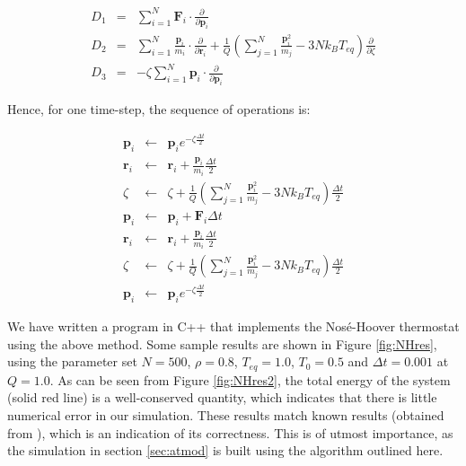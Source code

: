 \documentclass[a4paper,10pt]{article}
\begin{document}
\begin{eqnarray}
\displaystyle
D_1 &=& \sum_{i=1}^N \mathbf{F}_i \cdot \frac{\partial}{\partial \mathbf{p}_i} \\
D_2 &=& \displaystyle\sum_{i=1}^N \frac{\mathbf{p}_i}{m_i} \cdot \frac{\partial}{\partial \mathbf{r}_i} + \frac{1}{Q} \left( \displaystyle\sum_{j=1}^N \frac{\mathbf{p}_i^2}{m_j} - 3Nk_B T_{eq} \right) \frac{\partial}{\partial \zeta} \\
D_3 &=& -\zeta \sum_{i=1}^N \mathbf{p}_i \cdot \frac{\partial}{\partial \mathbf{p}_i}
\end{eqnarray}

Hence, for one time-step, the sequence of operations is:

\begin{eqnarray*}
\mathbf{p}_i &\leftarrow& \mathbf{p}_i e^{-\zeta \frac{\Delta t}{2}} \\
\mathbf{r}_i &\leftarrow& \mathbf{r}_i + \frac{\mathbf{p}_i}{m_i} \frac{\Delta t}{2} \\
\zeta &\leftarrow& \zeta + \frac{1}{Q} \left( \displaystyle\sum_{j=1}^N \frac{\mathbf{p}_i^2}{m_j} - 3Nk_B T_{eq} \right) \frac{\Delta t}{2} \\
\mathbf{p}_i &\leftarrow& \mathbf{p}_i + \mathbf{F}_i \Delta t \\
\mathbf{r}_i &\leftarrow& \mathbf{r}_i + \frac{\mathbf{p}_i}{m_i} \frac{\Delta t}{2} \\
\zeta &\leftarrow& \zeta + \frac{1}{Q} \left( \displaystyle\sum_{j=1}^N \frac{\mathbf{p}_i^2}{m_j} - 3Nk_B T_{eq} \right) \frac{\Delta t}{2} \\
\mathbf{p}_i &\leftarrow& \mathbf{p}_i e^{-\zeta \frac{\Delta t}{2}}
\end{eqnarray*}

We have written a program in C++ that implements the Nos\'{e}-Hoover thermostat using the above method. Some sample results are shown in Figure \ref{fig:NHres}, using the parameter set $N=500$, $\rho=0.8$, $T_{eq}=1.0$, $T_0 = 0.5$ and $\Delta t = 0.001$ at $Q=1.0$. As can be seen from Figure \ref{fig:NHres2}, the total energy of the system (solid red line) is a well-conserved quantity, which indicates that there is little numerical error in our simulation. These results match known results (obtained from \cite{OkumuraNotes}), which is an indication of its correctness. This is of utmost importance, as the simulation in section \ref{sec:atmod} is built using the algorithm outlined here.
\end{document}
